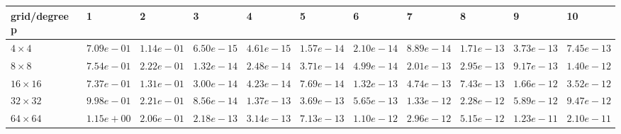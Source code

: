 \begin{tabular}{lllllllllll}
\hline
 grid/degree p   & 1          & 2          & 3          & 4          & 5          & 6          & 7          & 8          & 9          & 10         \\
\hline
 $4 \times 4$    & $7.09e-01$ & $1.14e-01$ & $6.50e-15$ & $4.61e-15$ & $1.57e-14$ & $2.10e-14$ & $8.89e-14$ & $1.71e-13$ & $3.73e-13$ & $7.45e-13$ \\
 $8 \times 8$    & $7.54e-01$ & $2.22e-01$ & $1.32e-14$ & $2.48e-14$ & $3.71e-14$ & $4.99e-14$ & $2.01e-13$ & $2.95e-13$ & $9.17e-13$ & $1.40e-12$ \\
 $16 \times 16$  & $7.37e-01$ & $1.31e-01$ & $3.00e-14$ & $4.23e-14$ & $7.69e-14$ & $1.32e-13$ & $4.74e-13$ & $7.43e-13$ & $1.66e-12$ & $3.52e-12$ \\
 $32 \times 32$  & $9.98e-01$ & $2.21e-01$ & $8.56e-14$ & $1.37e-13$ & $3.69e-13$ & $5.65e-13$ & $1.33e-12$ & $2.28e-12$ & $5.89e-12$ & $9.47e-12$ \\
 $64 \times 64$  & $1.15e+00$ & $2.06e-01$ & $2.18e-13$ & $3.14e-13$ & $7.13e-13$ & $1.10e-12$ & $2.96e-12$ & $5.15e-12$ & $1.23e-11$ & $2.10e-11$ \\
\hline
\end{tabular}